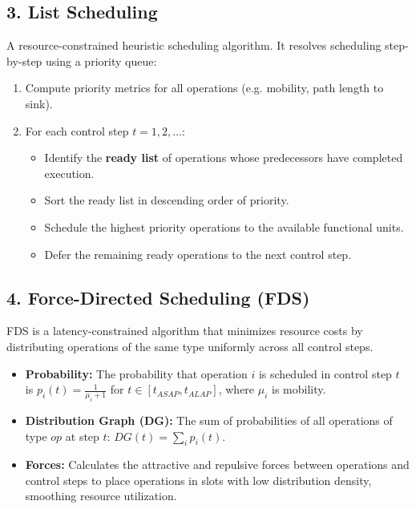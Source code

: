\documentclass[12pt,a4paper]{article}
\begin{document}
\subsection{3. List Scheduling}
A resource-constrained heuristic scheduling algorithm. It resolves scheduling step-by-step using a priority queue:
\begin{enumerate}[leftmargin=*, itemsep=2pt]
  \item Compute priority metrics for all operations (e.g. mobility, path length to sink).
  \item For each control step $t = 1, 2, \dots$:
    \begin{itemize}[leftmargin=*, label=$\bullet$, itemsep=1.5pt]
      \item Identify the \textbf{ready list} of operations whose predecessors have completed execution.
      \item Sort the ready list in descending order of priority.
      \item Schedule the highest priority operations to the available functional units.
      \item Defer the remaining ready operations to the next control step.
    \end{itemize}
\end{enumerate}

\subsection{4. Force-Directed Scheduling (FDS)}
FDS is a latency-constrained algorithm that minimizes resource costs by distributing operations of the same type uniformly across all control steps.
\begin{itemize}[leftmargin=*, itemsep=2pt]
  \item \textbf{Probability:} The probability that operation $i$ is scheduled in control step $t$ is $p_i(t) = \frac{1}{\mu_i + 1}$ for $t \in [t_{ASAP}, t_{ALAP}]$, where $\mu_i$ is mobility.
  \item \textbf{Distribution Graph (DG):} The sum of probabilities of all operations of type $op$ at step $t$: $DG(t) = \sum_{i} p_i(t)$.
  \item \textbf{Forces:} Calculates the attractive and repulsive forces between operations and control steps to place operations in slots with low distribution density, smoothing resource utilization.
\end{itemize}

\end{document}
